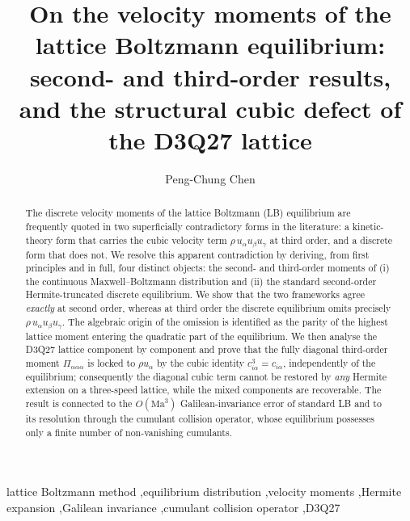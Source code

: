 \documentclass[preprint,11pt]{elsarticle}
\begin{document}
\begin{frontmatter}

\title{On the velocity moments of the lattice Boltzmann equilibrium:
second- and third-order results, and the structural cubic defect of the
D3Q27 lattice}

\author{Peng-Chung Chen}
\address{Computational Fluid Dynamics Laboratory, Department of Power
Mechanical Engineering, National Tsing Hua University, Hsinchu 30013, Taiwan}

\begin{abstract}
The discrete velocity moments of the lattice Boltzmann (LB) equilibrium are
frequently quoted in two superficially contradictory forms in the
literature: a kinetic-theory form that carries the cubic velocity term
$\rho\,u_\alpha u_\beta u_\gamma$ at third order, and a discrete form that does
not. We resolve this apparent contradiction by deriving, from first
principles and in full, four distinct objects: the second- and third-order
moments of (i) the continuous Maxwell--Boltzmann distribution and (ii) the
standard second-order Hermite-truncated discrete equilibrium. We show that
the two frameworks agree \emph{exactly} at second order, whereas at third
order the discrete equilibrium omits precisely $\rho\,u_\alpha u_\beta
u_\gamma$. The algebraic origin of the omission is identified as the parity of
the highest lattice moment entering the quadratic part of the equilibrium.
We then analyse the D3Q27 lattice component by component and prove that the
fully diagonal third-order moment $\Pi_{\alpha\alpha\alpha}$ is locked to
$\rho u_\alpha$ by the cubic identity $c_{i\alpha}^{3}=c_{i\alpha}$,
independently of the equilibrium; consequently the diagonal cubic term cannot
be restored by \emph{any} Hermite extension on a three-speed lattice, while
the mixed components are recoverable. The result is connected to the
$O(\mathrm{Ma}^{3})$ Galilean-invariance error of standard LB and to its
resolution through the cumulant collision operator, whose equilibrium
possesses only a finite number of non-vanishing cumulants.
\end{abstract}

\begin{keyword}
lattice Boltzmann method \sep equilibrium distribution \sep velocity moments
\sep Hermite expansion \sep Galilean invariance \sep cumulant collision
operator \sep D3Q27
\end{keyword}

\end{frontmatter}
\end{document}

